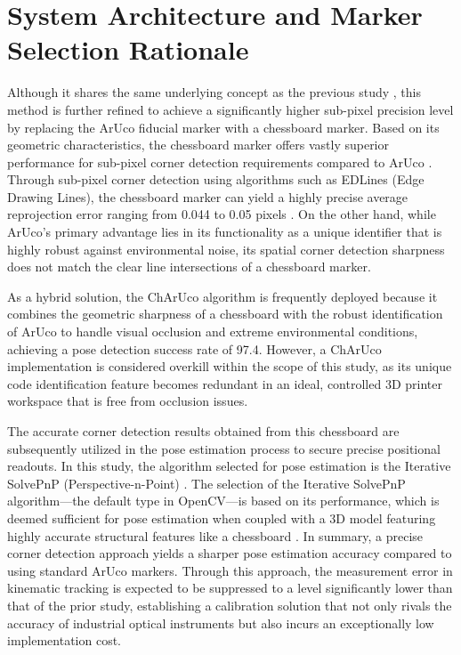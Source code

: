 \section{System Architecture and Marker Selection Rationale}
\label{rationale}
Although it shares the same underlying concept as the previous study \cite{Owais2026}, this method is further refined to achieve a significantly higher sub-pixel precision level by replacing the ArUco fiducial marker with a chessboard marker. Based on its geometric characteristics, the chessboard marker offers vastly superior performance for sub-pixel corner detection requirements compared to ArUco \cite{Triyono2024, Dan2022}. Through sub-pixel corner detection using algorithms such as EDLines (Edge Drawing Lines), the chessboard marker can yield a highly precise average reprojection error ranging from 0.044 to 0.05 pixels \cite{Dan2022}. On the other hand, while ArUco's primary advantage lies in its functionality as a unique identifier that is highly robust against environmental noise, its spatial corner detection sharpness does not match the clear line intersections of a chessboard marker. 

As a hybrid solution, the ChArUco algorithm is frequently deployed because it combines the geometric sharpness of a chessboard with the robust identification of ArUco to handle visual occlusion and extreme environmental conditions, achieving a pose detection success rate of 97.4\cite{Hu2019}. However, a ChArUco implementation is considered overkill within the scope of this study, as its unique code identification feature becomes redundant in an ideal, controlled 3D printer workspace that is free from occlusion issues. 

The accurate corner detection results obtained from this chessboard are subsequently utilized in the pose estimation process to secure precise positional readouts. In this study, the algorithm selected for pose estimation is the Iterative SolvePnP (Perspective-n-Point) \cite{opencv_solvepnp}. The selection of the Iterative SolvePnP algorithm—the default type in OpenCV—is based on its performance, which is deemed sufficient for pose estimation when coupled with a 3D model featuring highly accurate structural features like a chessboard \cite{Zhou2025}. In summary, a precise corner detection approach yields a sharper pose estimation accuracy compared to using standard ArUco markers. Through this approach, the measurement error in kinematic tracking is expected to be suppressed to a level significantly lower than that of the prior study, establishing a calibration solution that not only rivals the accuracy of industrial optical instruments but also incurs an exceptionally low implementation cost.